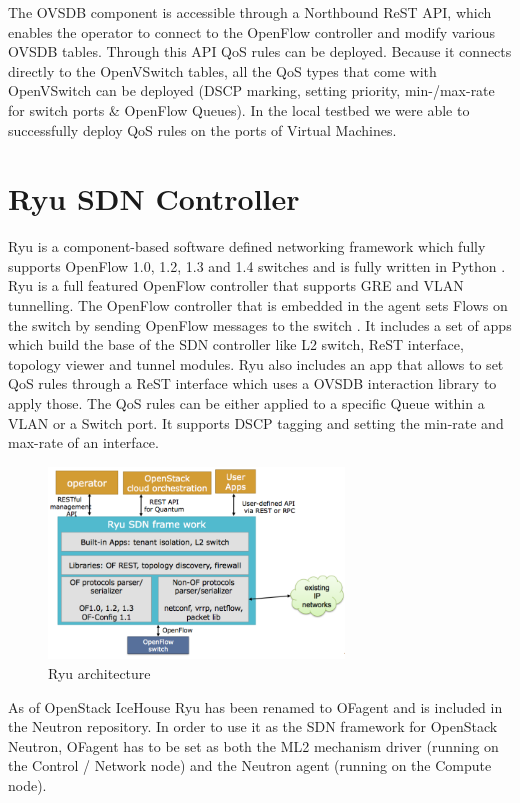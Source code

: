 The OVSDB component is accessible through a Northbound ReST API, which enables the operator to connect to the OpenFlow controller and modify various OVSDB tables. Through this API QoS rules can be deployed. Because it connects directly to the OpenVSwitch tables, all the QoS types that come with OpenVSwitch can be deployed (DSCP marking, setting priority, min-/max-rate for switch ports \& OpenFlow Queues). In the local testbed we were able to successfully deploy QoS rules on the ports of Virtual Machines. 


\section{Ryu SDN Controller}

Ryu is a component-based software defined networking framework which fully supports OpenFlow 1.0, 1.2, 1.3 and 1.4 switches and is fully written in Python \cite{ryu-start}. Ryu is a full featured OpenFlow controller that supports GRE and VLAN tunnelling. The OpenFlow controller that is embedded in the agent sets Flows on the switch by sending OpenFlow messages to the switch \cite{ryu-comparison}. It includes a set of apps which build the base of the SDN controller like L2 switch, ReST interface, topology viewer and tunnel modules. Ryu also includes an app that allows to set QoS rules through a ReST interface which uses a OVSDB interaction library to apply those. The QoS rules can be either applied to a specific Queue within a VLAN or a Switch port. It supports DSCP tagging and setting the min-rate and max-rate of an interface.

\begin{figure}[H]
\centering
\includegraphics[width=0.7\textwidth]{images/sota/ryu_architecture.png}
\caption{Ryu architecture}
\end{figure}


As of OpenStack IceHouse Ryu has been renamed to OFagent and is included in the Neutron repository. In order to use it as the SDN framework for OpenStack Neutron, OFagent has to be set as both the ML2 mechanism driver (running on the Control / Network node) and the Neutron agent (running on the Compute node). 


